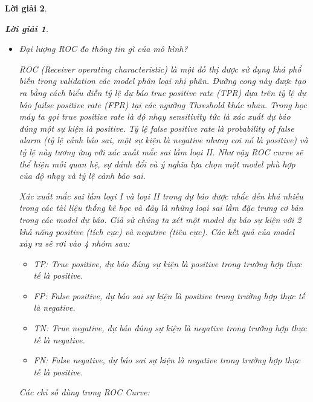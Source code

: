 \documentclass[14pt, a4paper]{article}
\theoremstyle{sltheorem}
\theoremstyle{soltheorem}
\newtheorem*{loigiai}{Lời giải}
\begin{document}
\begin{loigiai}
    \begin{loigiai}
        \begin{itemize}
            \item Đại lượng ROC đo thông tin gì của mô hình?
            
            ROC (Receiver operating characteristic) là một đồ thị được sử dụng khá phổ biến trong validation các model phân loại nhị phân. Đường cong này được tạo ra bằng cách biểu diễn tỷ lệ dự báo true positive rate (TPR) dựa trên tỷ lệ dự báo failse positive rate (FPR) tại các ngưỡng Threshold khác nhau. 
            Trong học máy ta gọi true positive rate là độ nhạy sensitivity tức là xác xuất dự báo đúng một sự kiện là positive. Tỷ lệ false positive rate là probability of false alarm (tỷ lệ cảnh báo sai, một sự kiện là negative nhưng coi nó là positive) và tỷ lệ này tương ứng với xác xuất mắc sai lầm loại II. Như vậy ROC curve sẽ thể hiện mối quan hệ, sự đánh đổi và ý nghĩa lựa chọn một model phù hợp của độ nhạy và tỷ lệ cảnh báo sai.

            Xác xuất mắc sai lầm loại I và loại II trong dự báo được nhắc đến khá nhiều trong các tài liệu thống kê học và đây là những loại sai lầm đặc trưng cơ bản trong các model dự báo. Giả sử chúng ta xét một model dự báo sự kiện với 2 khả năng positive (tích cực) và negative (tiêu cực). Các kết quả của model xảy ra sẽ rơi vào 4 nhóm sau:

            \begin{itemize}
                \item TP: True positive, dự báo đúng sự kiện là positive trong trường hợp thực tế là positive.
                \item FP: False positive, dự báo sai sự kiện là positive trong trường hợp thực tế là negative.
                \item TN: True negative, dự báo đúng sự kiện là negative trong trường hợp thực tế là negative.
                \item FN: False negative, dự báo sai sự kiện là negative trong trường hợp thực tế là positive.
            \end{itemize}

            Các chỉ số dùng trong ROC Curve:


\end{itemize}
\end{loigiai}
\end{loigiai}
\end{document}
